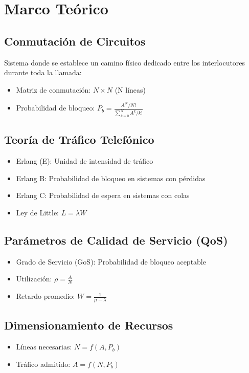 \documentclass[journal]{IEEEtran} %
\begin{document}
\section{Marco Teórico}

\subsection{Conmutación de Circuitos}
Sistema donde se establece un camino físico dedicado entre los interlocutores durante toda la llamada:
\begin{itemize}
    \item Matriz de conmutación: $N \times N$ (N líneas)
    \item Probabilidad de bloqueo: $P_b = \frac{A^N/N!}{\sum_{k=0}^{N} A^k/k!}$
\end{itemize}

\subsection{Teoría de Tráfico Telefónico}
\begin{itemize}
    \item Erlang (E): Unidad de intensidad de tráfico
    \item Erlang B: Probabilidad de bloqueo en sistemas con pérdidas
    \item Erlang C: Probabilidad de espera en sistemas con colas
    \item Ley de Little: $L = \lambda W$
\end{itemize}

\subsection{Parámetros de Calidad de Servicio (QoS)}
\begin{itemize}
    \item Grado de Servicio (GoS): Probabilidad de bloqueo aceptable
    \item Utilización: $\rho = \frac{A}{N}$
    \item Retardo promedio: $W = \frac{1}{\mu - \lambda}$
\end{itemize}

\subsection{Dimensionamiento de Recursos}
\begin{itemize}
    \item Líneas necesarias: $N = f(A, P_b)$
    \item Tráfico admitido: $A = f(N, P_b)$
\end{itemize}
\end{document}
